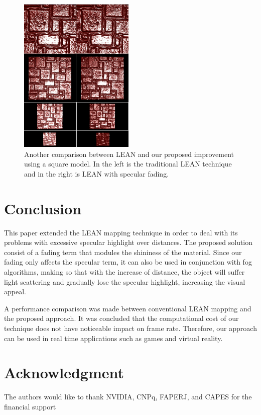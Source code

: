 \documentclass[10pt, conference]{IEEEtran}
\begin{document}
\begin{figure}[H]
	\includegraphics[width=0.49\textwidth]{figs/LS2.png}
	\caption{Another comparison between LEAN and our proposed improvement using a square model. In the left is the traditional LEAN technique and in the right is LEAN with specular fading.}
	\label{fig:LS2}
\end{figure}
\section{Conclusion}
\label{sec:conclusion}
%
This paper extended the LEAN mapping technique in order to deal with its problems with excessive specular highlight over distances. The proposed solution consist of a fading term that modules the shininess of the material. Since our fading only affects the specular term, it can also be used in conjunction with fog algorithms, making so that with the increase of distance, the object will suffer light scattering and gradually lose the specular highlight, increasing the visual appeal.

A performance comparison was made between conventional LEAN mapping and the proposed approach. It was concluded that the computational cost of our technique does not have noticeable impact on frame rate. Therefore, our approach can be used in real time applications such as games and virtual reality.


\iffinal
\section*{Acknowledgment}
%
The authors would like to thank NVIDIA, CNPq, FAPERJ, and CAPES for the financial support
\fi
\end{document}
